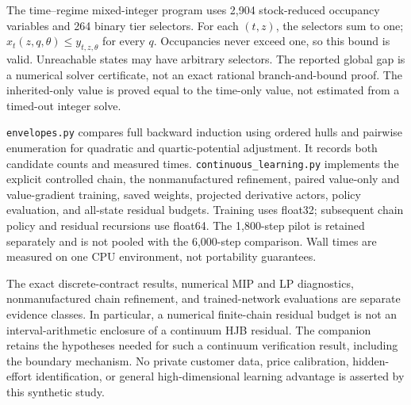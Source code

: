 \documentclass[11pt,letterpaper]{article}
\theoremstyle{definition}
\newcommand{\1}{\mathbf 1}
\begin{document}
The time--regime mixed-integer program uses 2,904 stock-reduced occupancy variables and 264 binary tier selectors. For each $(t,z)$, the selectors sum to one; $x_t(z,q,\theta)\leq y_{t,z,\theta}$ for every $q$. Occupancies never exceed one, so this bound is valid. Unreachable states may have arbitrary selectors. The reported global gap is a numerical solver certificate, not an exact rational branch-and-bound proof. The inherited-only value is proved equal to the time-only value, not estimated from a timed-out integer solve.

\texttt{envelopes.py} compares full backward induction using ordered hulls and pairwise enumeration for quadratic and quartic-potential adjustment. It records both candidate counts and measured times. \texttt{continuous\_learning.py} implements the explicit controlled chain, the nonmanufactured refinement, paired value-only and value-gradient training, saved weights, projected derivative actors, policy evaluation, and all-state residual budgets. Training uses float32; subsequent chain policy and residual recursions use float64. The 1,800-step pilot is retained separately and is not pooled with the 6,000-step comparison. Wall times are measured on one CPU environment, not portability guarantees.

The exact discrete-contract results, numerical MIP and LP diagnostics, nonmanufactured chain refinement, and trained-network evaluations are separate evidence classes. In particular, a numerical finite-chain residual budget is not an interval-arithmetic enclosure of a continuum HJB residual. The companion retains the hypotheses needed for such a continuum verification result, including the boundary mechanism. No private customer data, price calibration, hidden-effort identification, or general high-dimensional learning advantage is asserted by this synthetic study.

\end{document}
